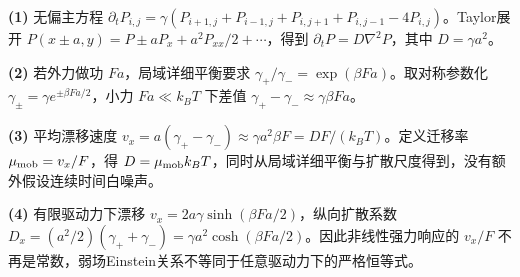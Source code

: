 \par\noindent\textbf{(1)} 无偏主方程 \(\partial_tP_{i,j}=\gamma(P_{i+1,j}+P_{i-1,j}+P_{i,j+1}+P_{i,j-1}-4P_{i,j})\)。Taylor展开 \(P(x\pm a,y)=P\pm aP_x+a^2P_{xx}/2+\cdots\)，得到 \(\partial_tP=D\nabla^2P\)，其中 \(D=\gamma a^2\)。
\par\noindent\textbf{(2)} 若外力做功 \(Fa\)，局域详细平衡要求 \(\gamma_+/\gamma_-=\exp(\beta Fa)\)。取对称参数化 \(\gamma_\pm=\gamma e^{\pm\beta Fa/2}\)，小力 \(Fa\ll k_BT\) 下差值 \(\gamma_+-\gamma_-\approx\gamma\beta Fa\)。
\par\noindent\textbf{(3)} 平均漂移速度 \(v_x=a(\gamma_+-\gamma_-)\approx\gamma a^2\beta F=DF/(k_BT)\)。定义迁移率 \(\mu_{\rm mob}=v_x/F\)，得 \(D=\mu_{\rm mob}k_BT\)，同时从局域详细平衡与扩散尺度得到，没有额外假设连续时间白噪声。
\par\noindent\textbf{(4)} 有限驱动力下漂移 \(v_x=2a\gamma\sinh(\beta Fa/2)\)，纵向扩散系数 \(D_x=(a^2/2)(\gamma_++\gamma_-)=\gamma a^2\cosh(\beta Fa/2)\)。因此非线性强力响应的 \(v_x/F\) 不再是常数，弱场Einstein关系不等同于任意驱动力下的严格恒等式。
